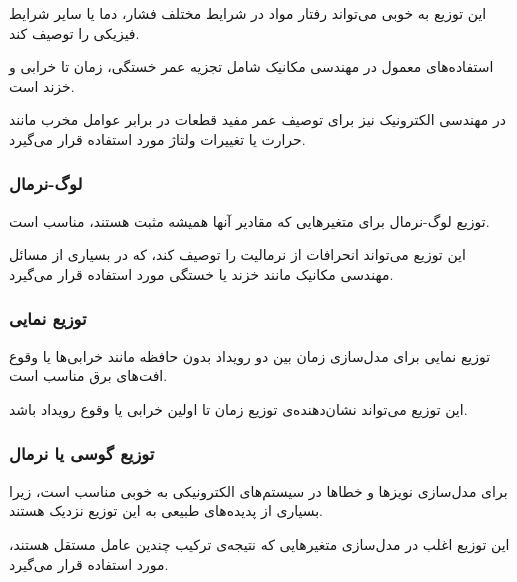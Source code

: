 این توزیع به خوبی می‌تواند رفتار مواد در شرایط مختلف فشار، دما یا سایر شرایط فیزیکی را توصیف کند.

استفاده‌های معمول در مهندسی مکانیک شامل تجزیه عمر خستگی، زمان تا خرابی و خزند است.

در مهندسی الکترونیک نیز برای توصیف عمر مفید قطعات در برابر عوامل مخرب مانند حرارت یا تغییرات ولتاژ مورد استفاده قرار می‌گیرد.

\subsubsection*{لوگ-نرمال}

توزیع لوگ-نرمال برای متغیرهایی که مقادیر آنها همیشه مثبت هستند، مناسب است.

این توزیع می‌تواند انحرافات از نرمالیت را توصیف کند، که در بسیاری از مسائل مهندسی مکانیک مانند خزند یا خستگی مورد استفاده قرار می‌گیرد.

\subsubsection*{توزیع نمایی}

توزیع نمایی برای مدل‌سازی زمان بین دو رویداد بدون حافظه مانند خرابی‌ها یا وقوع افت‌های برق مناسب است.

این توزیع می‌تواند نشان‌دهنده‌ی توزیع زمان تا اولین خرابی یا وقوع رویداد باشد.

\subsubsection*{توزیع گوسی یا نرمال}


برای مدل‌سازی نویز‌ها و خطاها در سیستم‌های الکترونیکی به خوبی مناسب است، زیرا بسیاری از پدیده‌های طبیعی به این توزیع نزدیک هستند.

این توزیع اغلب در مدل‌سازی متغیرهایی که نتیجه‌ی ترکیب چندین عامل مستقل هستند، مورد استفاده قرار می‌گیرد.
